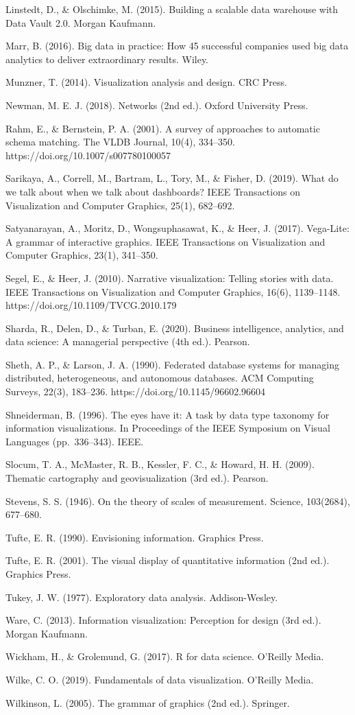 Linstedt, D., \& Olschimke, M. (2015). Building a scalable data warehouse with Data Vault 2.0. Morgan Kaufmann.

Marr, B. (2016). Big data in practice: How 45 successful companies used big data analytics to deliver extraordinary results. Wiley.

Munzner, T. (2014). Visualization analysis and design. CRC Press.

Newman, M. E. J. (2018). Networks (2nd ed.). Oxford University Press.

Rahm, E., \& Bernstein, P. A. (2001). A survey of approaches to automatic schema matching. The VLDB Journal, 10(4), 334–350. https://doi.org/10.1007/s007780100057

Sarikaya, A., Correll, M., Bartram, L., Tory, M., \& Fisher, D. (2019). What do we talk about when we talk about dashboards? IEEE Transactions on Visualization and Computer Graphics, 25(1), 682–692.

Satyanarayan, A., Moritz, D., Wongsuphasawat, K., \& Heer, J. (2017). Vega-Lite: A grammar of interactive graphics. IEEE Transactions on Visualization and Computer Graphics, 23(1), 341–350.

Segel, E., \& Heer, J. (2010). Narrative visualization: Telling stories with data. IEEE Transactions on Visualization and Computer Graphics, 16(6), 1139–1148. https://doi.org/10.1109/TVCG.2010.179

Sharda, R., Delen, D., \& Turban, E. (2020). Business intelligence, analytics, and data science: A managerial perspective (4th ed.). Pearson.

Sheth, A. P., \& Larson, J. A. (1990). Federated database systems for managing distributed, heterogeneous, and autonomous databases. ACM Computing Surveys, 22(3), 183–236. https://doi.org/10.1145/96602.96604

Shneiderman, B. (1996). The eyes have it: A task by data type taxonomy for information visualizations. In Proceedings of the IEEE Symposium on Visual Languages (pp. 336–343). IEEE.

Slocum, T. A., McMaster, R. B., Kessler, F. C., \& Howard, H. H. (2009). Thematic cartography and geovisualization (3rd ed.). Pearson.

Stevens, S. S. (1946). On the theory of scales of measurement. Science, 103(2684), 677–680.

Tufte, E. R. (1990). Envisioning information. Graphics Press.

Tufte, E. R. (2001). The visual display of quantitative information (2nd ed.). Graphics Press.

Tukey, J. W. (1977). Exploratory data analysis. Addison-Wesley.

Ware, C. (2013). Information visualization: Perception for design (3rd ed.). Morgan Kaufmann.

Wickham, H., \& Grolemund, G. (2017). R for data science. O’Reilly Media.

Wilke, C. O. (2019). Fundamentals of data visualization. O’Reilly Media.

Wilkinson, L. (2005). The grammar of graphics (2nd ed.). Springer.
